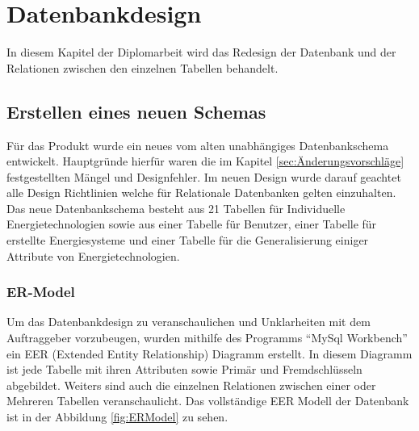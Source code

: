 \section{Datenbankdesign}
In diesem Kapitel der Diplomarbeit wird das Redesign der Datenbank und der Relationen zwischen den einzelnen Tabellen behandelt.


\subsection{Erstellen eines neuen Schemas}
Für das Produkt wurde ein neues vom alten unabhängiges Datenbankschema entwickelt. Hauptgründe hierfür waren die im Kapitel \ref{sec:Änderungsvorschläge} festgestellten Mängel und Designfehler. Im neuen Design wurde darauf geachtet alle Design Richtlinien welche für Relationale Datenbanken gelten einzuhalten. Das neue Datenbankschema besteht aus 21 Tabellen für Individuelle Energietechnologien sowie aus einer Tabelle für Benutzer, einer Tabelle für erstellte Energiesysteme und einer Tabelle für die Generalisierung einiger Attribute von Energietechnologien.

\subsubsection{ER-Model}
Um das Datenbankdesign zu veranschaulichen und Unklarheiten mit dem Auftraggeber vorzubeugen, wurden mithilfe des Programms “MySql Workbench” ein EER (Extended Entity Relationship) Diagramm erstellt. In diesem Diagramm ist jede Tabelle mit ihren Attributen sowie Primär und Fremdschlüsseln abgebildet. Weiters sind auch die einzelnen Relationen zwischen einer oder Mehreren Tabellen veranschaulicht. Das vollständige EER Modell der Datenbank ist in der Abbildung \ref{fig:ERModel} zu sehen.

